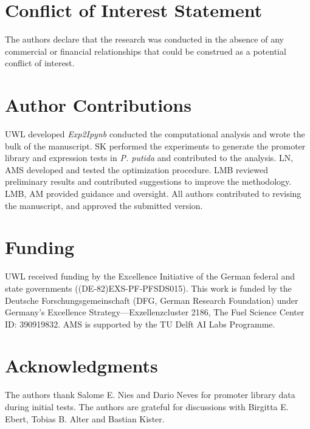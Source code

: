 \documentclass[utf8]{frontiersSCNS} %
\begin{document}

\section*{Conflict of Interest Statement}

The authors declare that the research was conducted in the absence of any commercial or financial relationships that could be construed as a potential conflict of interest.

\section*{Author Contributions}
UWL developed \textit{Exp2Ipynb} conducted the computational analysis and wrote the bulk of the manuscript. SK performed the experiments to generate the promoter library and expression tests in \textit{P. putida} and contributed to the analysis. LN, AMS developed and tested the optimization procedure. LMB reviewed preliminary results and contributed suggestions to improve the methodology. LMB, AM provided guidance and oversight. All authors contributed to revising the manuscript, and approved the submitted version.

\section*{Funding}
UWL received funding by the Excellence Initiative of the German federal and state governments ((DE-82)EXS-PF-PFSDS015). This work is funded by the Deutsche Forschungsgemeinschaft (DFG, German Research Foundation) under Germany’s Excellence Strategy—Exzellenzcluster 2186, The Fuel Science Center ID: 390919832. AMS is supported by the TU Delft AI Labs Programme.

\section*{Acknowledgments}
The authors thank Salome E. Nies and Dario Neves for promoter library data during initial tests. The authors are grateful for discussions with Birgitta E. Ebert, Tobias B. Alter and Bastian Kister.
\end{document}
